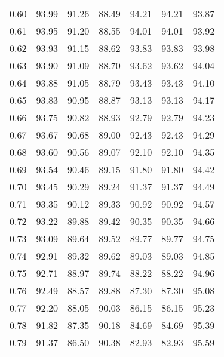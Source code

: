 \begin{tabular}{|c|c|c|c|c|c|c|}
      0.60 &     93.99 &     91.26 &      88.49 &   94.21 &      94.21 &         93.87 \\
      0.61 &     93.95 &     91.20 &      88.55 &   94.01 &      94.01 &         93.92 \\
      0.62 &     93.93 &     91.15 &      88.62 &   93.83 &      93.83 &         93.98 \\
      0.63 &     93.90 &     91.09 &      88.70 &   93.62 &      93.62 &         94.04 \\
      0.64 &     93.88 &     91.05 &      88.79 &   93.43 &      93.43 &         94.10 \\
      0.65 &     93.83 &     90.95 &      88.87 &   93.13 &      93.13 &         94.17 \\
      0.66 &     93.75 &     90.82 &      88.93 &   92.79 &      92.79 &         94.23 \\
      0.67 &     93.67 &     90.68 &      89.00 &   92.43 &      92.43 &         94.29 \\
      0.68 &     93.60 &     90.56 &      89.07 &   92.10 &      92.10 &         94.35 \\
      0.69 &     93.54 &     90.46 &      89.15 &   91.80 &      91.80 &         94.42 \\
      0.70 &     93.45 &     90.29 &      89.24 &   91.37 &      91.37 &         94.49 \\
      0.71 &     93.35 &     90.12 &      89.33 &   90.92 &      90.92 &         94.57 \\
      0.72 &     93.22 &     89.88 &      89.42 &   90.35 &      90.35 &         94.66 \\
      0.73 &     93.09 &     89.64 &      89.52 &   89.77 &      89.77 &         94.75 \\
      0.74 &     92.91 &     89.32 &      89.62 &   89.03 &      89.03 &         94.85 \\
      0.75 &     92.71 &     88.97 &      89.74 &   88.22 &      88.22 &         94.96 \\
      0.76 &     92.49 &     88.57 &      89.88 &   87.30 &      87.30 &         95.08 \\
      0.77 &     92.20 &     88.05 &      90.03 &   86.15 &      86.15 &         95.23 \\
      0.78 &     91.82 &     87.35 &      90.18 &   84.69 &      84.69 &         95.39 \\
      0.79 &     91.37 &     86.50 &      90.38 &   82.93 &      82.93 &         95.59 \\

\end{tabular}
